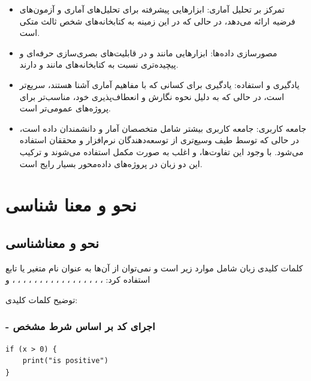 \documentclass[11pt, a4paper, oneside]{book}
\begin{document}
			\begin{itemize}
				
				\item {\large تمرکز بر تحلیل آماری}:
				{\normalsize {} ابزارهایی پیشرفته برای تحلیل‌های آماری و آزمون‌های فرضیه ارائه می‌دهد، در حالی که  در این زمینه به کتابخانه‌های شخص ثالث متکی است.}
				
				\item {\large مصورسازی داده‌ها}:
				{\normalsize ابزارهایی مانند  و  در  قابلیت‌های بصری‌سازی حرفه‌ای و پیچیده‌تری نسبت به کتابخانه‌های  مانند  و  دارند.}
				
				\item {\large یادگیری و استفاده}:
				{\normalsize یادگیری  برای کسانی که با مفاهیم آماری آشنا هستند، سریع‌تر است، در حالی که  به دلیل نحوه نگارش و انعطاف‌پذیری خود، مناسب‌تر برای پروژه‌های عمومی‌تر است.}
				
				\item {\large جامعه کاربری}:
				{\normalsize جامعه کاربری  بیشتر شامل متخصصان آمار و دانشمندان داده است، در حالی که  توسط طیف وسیع‌تری از توسعه‌دهندگان نرم‌افزار و محققان استفاده می‌شود.
					با وجود این تفاوت‌ها،  و  اغلب به صورت مکمل استفاده می‌شوند و ترکیب این دو زبان در پروژه‌های داده‌محور بسیار رایج است.}
				
			\end{itemize}
			
	
	
	\chapter{نحو و معنا شناسی}
	
		\section{نحو و معناشناسی}
		
			کلمات کلیدی زبان  شامل موارد زیر است و نمی‌توان از آن‌ها به عنوان نام متغیر یا تابع استفاده کرد:
			، ، ، ، ، ، ، ، ، ، ، ، ، ، ، ، ،  و 
			
			توضیح کلمات کلیدی:
			
			\subsection{ - اجرای کد بر اساس شرط مشخص}
				\begin{latin}
					\begin{lstlisting}[caption={\lr{if}}]
if (x > 0) {
	print("is positive")
}
					\end{lstlisting}
				\end{latin}
			
\end{document}

